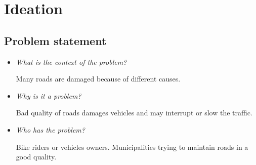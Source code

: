 \documentclass[10pt,a4paper]{article} %
\begin{document}
    \pagestyle{plain}
    \title{\rmfamily\normalfont{}}
    \author{}
    \date{} %
    
    \maketitle
    
       
    \tableofcontents
    
    \section{Ideation}
\subsection  {Problem statement}
\begin{itemize}
\item \textit{What is the context of the problem? }

Many roads are damaged because of different causes.
\item \textit{Why is it a problem?}

Bad quality of roads damages vehicles and may interrupt or slow the traffic.
\item \textit{Who has the problem?}

Bike riders or vehicles owners.
Municipalities trying to maintain roads in a good quality.


\end{itemize}

     	
\end{document}
